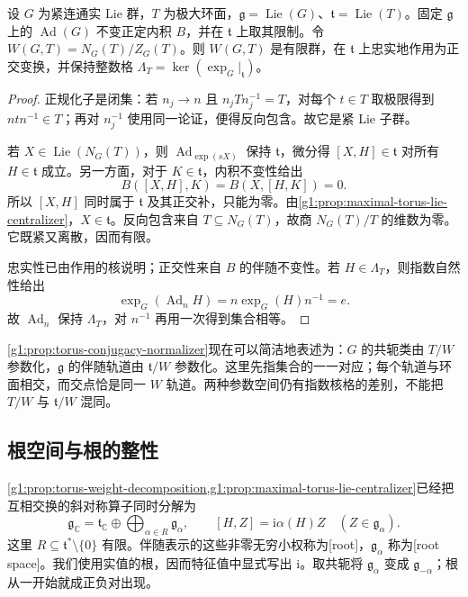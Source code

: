 \begin{proposition}\label{g1:prop:weyl-group-finite}
	设 \(G\) 为紧连通实 Lie 群，\(T\) 为极大环面，\(\mathfrak g=\operatorname{Lie}(G)\)、\(\mathfrak t=\operatorname{Lie}(T)\)。固定 \(\mathfrak g\) 上的 \(\operatorname{Ad}(G)\) 不变正定内积 \(B\)，并在 \(\mathfrak t\) 上取其限制。令 \(W(G,T)=N_G(T)/Z_G(T)\)。则 \(W(G,T)\) 是有限群，在 \(\mathfrak t\) 上忠实地作用为正交变换，并保持整数格 \(\Lambda_T=\ker(\exp_G|_{\mathfrak t})\)。
\end{proposition}
\begin{proof}
	正规化子是闭集：若 \(n_j\to n\) 且 \(n_jTn_j^{-1}=T\)，对每个 \(t\in T\) 取极限得到 \(ntn^{-1}\in T\)；再对 \(n_j^{-1}\) 使用同一论证，便得反向包含。故它是紧 Lie 子群。

	若 \(X\in\operatorname{Lie}(N_G(T))\)，则 \(\operatorname{Ad}_{\exp(sX)}\) 保持 \(\mathfrak t\)，微分得 \([X,H]\in\mathfrak t\) 对所有 \(H\in\mathfrak t\) 成立。另一方面，对于 \(K\in\mathfrak t\)，内积不变性给出
	\[
		B([X,H],K)=B(X,[H,K])=0.
	\]
	所以 \([X,H]\) 同时属于 \(\mathfrak t\) 及其正交补，只能为零。由\cref{g1:prop:maximal-torus-lie-centralizer}，\(X\in\mathfrak t\)。反向包含来自 \(T\subseteq N_G(T)\)，故商 \(N_G(T)/T\) 的维数为零。它既紧又离散，因而有限。

	忠实性已由作用的核说明；正交性来自 \(B\) 的伴随不变性。若 \(H\in\Lambda_T\)，则指数自然性给出
	\[
		\exp_G(\operatorname{Ad}_nH)=n\exp_G(H)n^{-1}=e.
	\]
	故 \(\operatorname{Ad}_n\) 保持 \(\Lambda_T\)，对 \(n^{-1}\) 再用一次得到集合相等。
\end{proof}

\cref{g1:prop:torus-conjugacy-normalizer}现在可以简洁地表述为：\(G\) 的共轭类由 \(T/W\) 参数化，\(\mathfrak g\) 的伴随轨道由 \(\mathfrak t/W\) 参数化。这里先指集合的一一对应；每个轨道与环面相交，而交点恰是同一 \(W\) 轨道。两种参数空间仍有指数核格的差别，不能把 \(T/W\) 与 \(\mathfrak t/W\) 混同。

\subsection{根空间与根的整性}
\label{g1:subsec:1904:02}
\cref{g1:prop:torus-weight-decomposition,g1:prop:maximal-torus-lie-centralizer}已经把互相交换的斜对称算子同时分解为
\begin{equation}\label{g1:eq:root-space-decomposition}
	\mathfrak g_{\mathbb C}=\mathfrak t_{\mathbb C}\oplus
	\bigoplus_{\alpha\in R}\mathfrak g_\alpha,
	\qquad
	[H,Z]=\mathrm{i}\alpha(H)Z\quad(Z\in\mathfrak g_\alpha).
\end{equation}
这里 \(R\subseteq\mathfrak t^*\setminus\{0\}\) 有限。伴随表示的这些非零无穷小权称为[root]，\(\mathfrak g_\alpha\) 称为[root space]。我们使用实值的根，因而特征值中显式写出 \(\mathrm{i}\)。取共轭将 \(\mathfrak g_\alpha\) 变成 \(\mathfrak g_{-\alpha}\)；根从一开始就成正负对出现。

